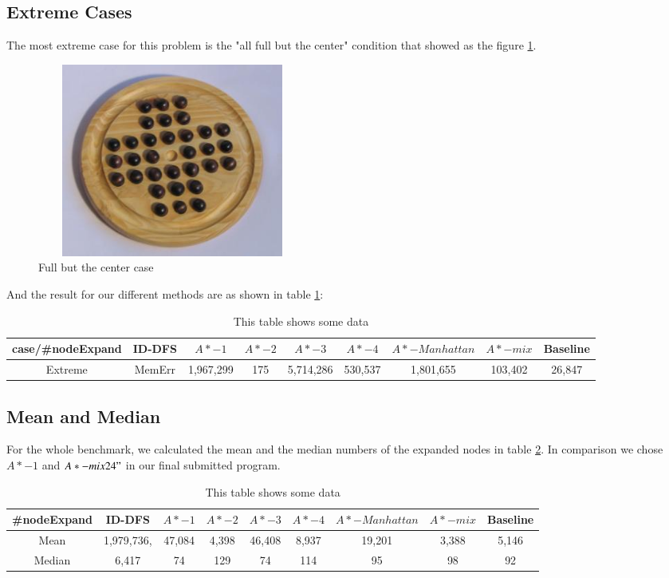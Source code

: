 \documentclass[11pt,letter]{article}
\begin{document}
\subsection {Extreme Cases}
The most extreme case for this problem is the "all full but the center" condition that showed as the figure \ref{fig_full}. \\
\begin{figure} [h!]
\centering
\includegraphics[height=2.5in, width=3.5in]{figs/PegSolitaire_full.jpg}
\caption{Full but the center case}
\label{fig_full}
\end{figure}
And the result for our different methods are as shown in table \ref{tab_resfull}:
\begin{table}[h!]
  \centering
  \begin{tabular}{ | c | c |  c | c | c | c |  c | c| c|}
\hline
case/\#nodeExpand & ID-DFS & $A*- 1$ & $A*-2$ & $A*-3$ & $A*-4$ & $A*-Manhattan$ & $A*-mix$ & Baseline \\ \hline
Extreme & MemErr & 1,967,299 & 175 & 5,714,286 & 530,537 & 1,801,655 & 103,402 & 26,847 \\ \hline
  \end{tabular}
  \caption{This table shows some data}
  \label{tab_resfull}
\end{table}
\subsection {Mean and Median}
For the whole benchmark, we calculated the mean and the median numbers of the expanded nodes in table \ref{tbl_mean}. In comparison we chose $A*-1$ and $A*-mix24"$ in our final submitted program. \\
\begin{table}[h!]
  \centering
  \begin{tabular}{ | c | c |  c | c | c | c |  c | c| c|}
\hline
\#nodeExpand & ID-DFS & $A*- 1$ & $A*-2$ & $A*-3$ & $A*-4$ & $A*-Manhattan$ & $A*-mix$ & Baseline \\ \hline
Mean & 1,979,736, & 47,084 & 4,398 & 46,408 & 8,937 & 19,201 & 3,388 & 5,146 \\ \hline
Median & 6,417 & 74 & 129 & 74 & 114 & 95 & 98 & 92 \\ \hline
  \end{tabular}
  \caption{This table shows some data}
  \label{tbl_mean}
\end{table}
\end{document}
